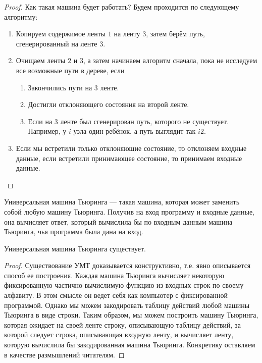 \begin{proof}
        \par Как такая машина будет работать? Будем проходится по следующему алгоритму:
        \begin{enumerate}
            \item Копируем содержимое ленты $1$ на ленту $3$, затем берём путь, сгенерированный на ленте $3$.
            \item Очищаем ленты $2$ и $3$, а затем начинаем алгоритм сначала, пока не исследуем все возможные пути в дереве, если
                \begin{enumerate}
                    \item Закончились пути на $3$ ленте.
                    \item Достигли отклоняющего состояния на второй ленте.
                    \item Если на 3 ленте был сгенерирован путь, которого не существует. Например, у $i$ узла один ребёнок, а путь выглядит так $i2$.
                \end{enumerate}
            \item Если мы встретили только отклоняющие состояние, то отклоняем входные данные, если встретили принимающее состояние, то принимаем входные данные.
        \end{enumerate}
    \end{proof}

        
    
    \begin{Def} 
        Универсальная машина Тьюринга --- такая машина, которая может заменить собой любую машину Тьюринга. Получив на вход программу и входные данные, она вычисляет ответ, который вычислила бы по входным данным машина Тьюринга, чья программа была дана на вход.
    \end{Def}
    
    \begin{Thm}
        Универсальная машина Тьюринга существует.
    \end{Thm}
    
    \begin{proof}
        Существование УМТ доказывается конструктивно, т.е. явно описывается способ ее построения. Каждая машина Тьюринга вычисляет некоторую фиксированную частично вычислимую функцию из входных строк по своему алфавиту. В этом смысле он ведет себя как компьютер с фиксированной программой. Однако мы можем закодировать таблицу действий любой машины Тьюринга в виде строки. Таким образом, мы можем построить машину Тьюринга, которая ожидает на своей ленте строку, описывающую таблицу действий, за которой следует строка, описывающая входную ленту, и вычисляет ленту, которую вычислила бы закодированная машина Тьюринга. Конкретику оставляем в качестве размышлений читателям.
    \end{proof}
    
